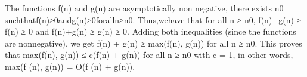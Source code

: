 
The functions f(n) and g(n) are asymptotically non negative, there exists
n0 suchthatf(n)≥0andg(n)≥0foralln≥n0. Thus,wehave that for all n ≥ n0,
f(n)+g(n) ≥ f(n) ≥ 0 and f(n)+g(n) ≥ g(n) ≥ 0. Adding both inequalities
(since the functions are nonnegative), we get f(n) + g(n) ≥ max(f(n),
g(n)) for all n ≥ n0. This proves that max(f(n), g(n)) ≤ c(f(n) + g(n))
for all n ≥ n0 with c = 1, in other words, max(f (n), g(n)) = O(f (n) + g(n)).
